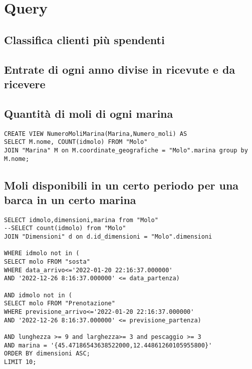 


\section{Query}

\subsection{Classifica clienti più spendenti}
\subsection{Entrate di ogni anno divise in ricevute e da ricevere}
\subsection{Quantità di moli di ogni marina}

\begin{lstlisting}
CREATE VIEW NumeroMoliMarina(Marina,Numero_moli) AS
SELECT M.nome, COUNT(idmolo) FROM "Molo"
JOIN "Marina" M on M.coordinate_geografiche = "Molo".marina group by M.nome;
\end{lstlisting}

\subsection{Moli disponibili in un certo periodo per una barca in un certo marina}

\begin{lstlisting}
SELECT idmolo,dimensioni,marina from "Molo"
--SELECT count(idmolo) from "Molo"
JOIN "Dimensioni" d on d.id_dimensioni = "Molo".dimensioni

WHERE idmolo not in (
SELECT molo FROM "sosta"
WHERE data_arrivo<='2022-01-20 22:16:37.000000'
AND '2022-12-26 8:16:37.000000' <= data_partenza)

AND idmolo not in (
SELECT molo FROM "Prenotazione"
WHERE previsione_arrivo<='2022-01-20 22:16:37.000000'
AND '2022-12-26 8:16:37.000000' <= previsione_partenza)

AND lunghezza >= 9 and larghezza>= 3 and pescaggio >= 3
AND marina = '{45.47186543638522000,12.44861260105955800}'
ORDER BY dimensioni ASC;
LIMIT 10;
\end{lstlisting}

